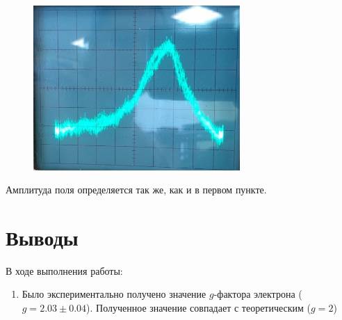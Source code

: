 \documentclass{article}
\begin{document}
\begin{figure}[H]
	\centering
	\includegraphics[width=0.7\textwidth]{Osc.jpeg}
\end{figure}


Амплитуда поля определяется так же, как и в первом пункте.

\section{Выводы}
В ходе выполнения работы:
\begin{enumerate}
	\item Было экспериментально получено значение \(g\)-фактора электрона (\(g = 2.03 \pm 0.04\)). Полученное значение совпадает с теоретическим (\(g = 2\))
\end{enumerate}
\end{document}

